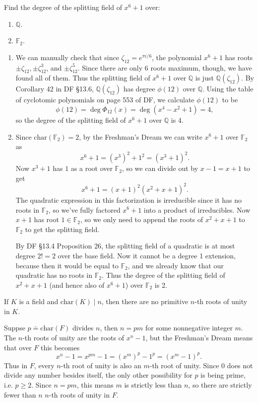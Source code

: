 \documentclass[10pt]{report}
\begin{document}
\begin{exer}[]
	Find the degree of the splitting field of $x^6+1$ over:
	\begin{enumerate}
		\item $\mathbb{Q}$.
		\item $\mathbb{F}_{2}$.
	\end{enumerate}
\end{exer}
\begin{enumerate}
	\item We can manually check that since $\zeta_{12}=e^{\pi i/6}$, the polynomial $x^6+1$ has roots $\pm \zeta_{12}, \pm \zeta_{12}^3$, and $\pm \zeta_{12}^5$. Since there are only 6 roots maximum, though, we have found all of them. Thus the splitting field of $x^6+1$ over $\mathbb{Q}$ is just $\mathbb{Q}(\zeta_{12})$. By Corollary 42 in DF \S 13.6, $\mathbb{Q}(\zeta_{12})$ has degree $\phi(12)$ over $\mathbb{Q}$. Using the table of cyclotomic polynomials on page 553 of DF, we calculate $\phi(12)$ to be
		\[
			\phi(12) = \deg \Phi_{12}(x) = \deg \left( x^4-x^2+1 \right)=4,
		\] so the degree of the splitting field of $x^6+1$ over $\mathbb{Q}$ is 4.

	\item Since $\text{char}(\mathbb{F}_{2})=2$, by the Freshman's Dream we can write $x^{6}+1$ over $\mathbb{F}_2$ as
		\[
			x^{6}+1 = (x^{3})^{2}+1^{2}= (x^{3}+1)^2.
		\] Now $x^{3}+1$ has $1$ as a root over $\mathbb{F}_2$, so we can divide out by $x-1=x+1$ to get
		\[
			x^{6}+1 = (x+1)^2 \left( x^2+x+1 \right)^{2}.
		\] The quadratic expression in this factorization is irreducible since it has no roots in $\mathbb{F}_{2}$, so we've fully factored $x^6+1$ into a product of irreducibles. Now $x+1$ has root $1 \in \mathbb{F}_{2}$, so we only need to append the roots of $x^{2}+x+1$ to $\mathbb{F}_{2}$ to get the splitting field.

		By DF \S 13.4 Proposition 26, the splitting field of a quadratic is at most degree $2!=2$ over the base field. Now it cannot be a degree 1 extension, because then it would be equal to $\mathbb{F}_2$, and we already know that our quadratic has no roots in $\mathbb{F}_2$. Thus the degree of the splitting field of $x^2+x+1$ (and hence also of $x^6+1$) over $\mathbb{F}_2$ is 2.
\end{enumerate}

\newpage

\begin{exer}[]
	If $K$ is a field and $\text{char}(K)\;|\; n$, then there are no primitive $n$-th roots of unity in $K$.
\end{exer}
Suppse $p \doteq \text{char}(F)$ divides $n$, then $n = pm$ for some nonnegative integer $m$. The $n$-th roots of unity are the roots of $x^n-1$, but the Freshman's Dream means that over $F$ this becomes
\[
	x^{n}-1 = x^{pm}-1 = (x^m)^p - 1^p = (x^{m}-1)^p.
\] Thus in $F$, every $n$-th root of unity is also an $m$-th root of unity. Since 0 does not divide any number besides itself, the only other possibility for $p$ is being prime, i.e. $p \geq 2$. Since $n = pm$, this means $m$ is strictly less than $n$, so there are strictly fewer than $n$ $n$-th roots of unity in $F$.
\end{document}
